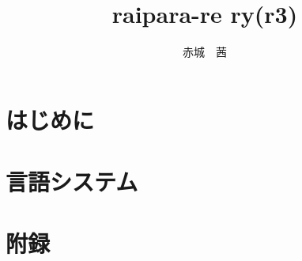 \documentclass[a4paper, 12pt, titlepage]{ltjsreport}
\title{raipara-re ry(r3)}
\author{赤城　茜}
\begin{document}
\maketitle

\setcounter{tocdepth}{2}
\tableofcontents

\part{はじめに}



\part{言語システム}








\part{附録}



\end{document}
